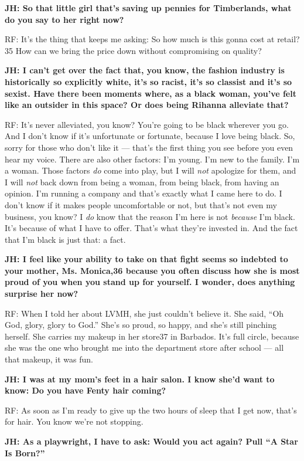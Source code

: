 \textbf{JH: So that little girl that's saving up pennies for
Timberlands, what do you say to her right now?}

RF: It's the thing that keeps me asking: So how much is this gonna cost
at retail?35 How can we bring the price down without compromising on
quality?

\textbf{JH: I can't get over the fact that, you know, the fashion
industry is historically so explicitly white, it's so racist, it's so
classist and it's so sexist. Have there been moments where, as a black
woman, you've felt like an outsider in this space? Or does being Rihanna
alleviate that?}

RF: It's never alleviated, you know? You're going to be black wherever
you go. And I don't know if it's unfortunate or fortunate, because I
love being black. So, sorry for those who don't like it --- that's the
first thing you see before you even hear my voice. There are also other
factors: I'm young. I'm new to the family. I'm a woman. Those factors
\emph{do} come into play, but I will \emph{not} apologize for them, and
I will \emph{not} back down from being a woman, from being black, from
having an opinion. I'm running a company and that's exactly what I came
here to do. I don't know if it makes people uncomfortable or not, but
that's not even my business, you know? I \emph{do} know that the reason
I'm here is not \emph{because} I'm black. It's because of what I have to
offer. That's what they're invested in. And the fact that I'm black is
just that: a fact.

\textbf{JH: I feel like your ability to take on that fight seems so
indebted to your mother, Ms. Monica,36 because you often discuss how she
is most proud of you when you stand up for yourself. I wonder, does
anything surprise her now?}

RF: When I told her about LVMH, she just couldn't believe it. She said,
``Oh God, glory, glory to God.'' She's so proud, so happy, and she's
still pinching herself. She carries my makeup in her store37 in
Barbados. It's full circle, because she was the one who brought me into
the department store after school --- all that makeup, it was fun.

\textbf{JH: I was at my mom's feet in a hair salon. I know she'd want to
know: Do you have Fenty hair coming?}

RF: As soon as I'm ready to give up the two hours of sleep that I get
now, that's for hair. You know we're not stopping.

\textbf{JH: As a playwright, I have to ask: Would you act again? Pull
``A Star Is Born?''}

